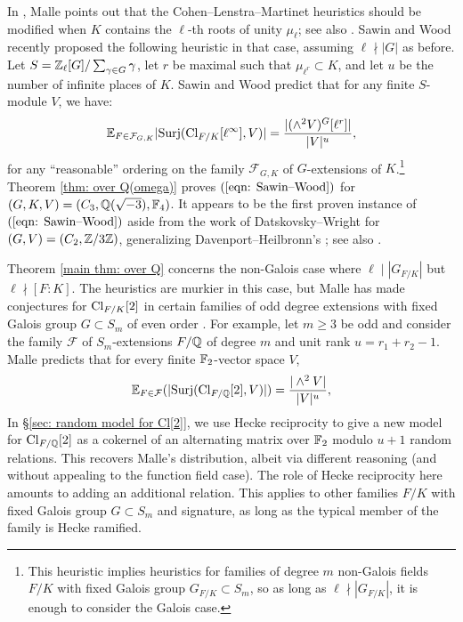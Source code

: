 \documentclass[11pt,a4paper]{amsart}
\def\F{{\rm \mathbb{F}}}
\def\Z{{\rm \mathbb{Z}}}
\def\Q{{\rm \mathbb{Q}}}
\def\Cl{{\rm Cl}}
\numberwithin{equation}{section}
\begin{document}
In  \cite{Malle}, Malle points out that the Cohen--Lenstra--Martinet heuristics should be modified when $K$ contains the $\ell$-th roots of unity $\mu_\ell$; see also \cite{Achter06, Garton2015, LipnowskiSawinTsimerman}. Sawin and Wood \cite{SawinWood} recently proposed the following heuristic in that case, assuming $\ell \nmid |G|$ as before. Let $S = \Z_\ell[G]/\sum_{\gamma \in G} \gamma$, let $r$ be maximal such that $\mu_{\ell^r} \subset K$, and let $u$ be the number of infinite places of $K$.  Sawin and Wood predict that for any finite $S$-module $V$, we have:
\begin{equation} \label{eqn: Sawin--Wood}
    \mathbb{E}_{F \in \mathcal{F}_{G,K}}|\mathrm{Surj}(\Cl_{F/K}[\ell^\infty],V)| = \dfrac{| (\wedge^2 V)^G[\ell^r]|}{|V|^u},
\end{equation}
for any ``reasonable'' ordering on the family $\mathcal{F}_{G,K}$ of $G$-extensions of $K$.\footnote{This heuristic implies heuristics for families of degree $m$ non-Galois fields $F/K$ with fixed Galois group $G_{F/K} \subset S_m$, so as long as $\ell \nmid |G_{F/K}|$, it is enough to consider the Galois case.}  Theorem \ref{thm: over Q(omega)} proves $(\ref{eqn: Sawin--Wood})$ for $(G,K,V) = (C_3,\Q(\sqrt{-3}),\F_4)$. It appears to be the first proven instance of $(\ref{eqn: Sawin--Wood})$ aside from the work of Datskovsky--Wright \cite{DatskovskyWright} for $(G,V) = (C_2,\Z/3\Z)$, generalizing Davenport--Heilbronn's \cite{DavenportHeilbronn}; see also \cite{LemkeOliverWangWood}.      


Theorem \ref{main thm: over Q} concerns the non-Galois case where $\ell \mid |G_{F/K}|$ but $\ell \nmid [F \colon K]$.  The heuristics are murkier in this case, but Malle has made conjectures for $\Cl_{F/K}[2]$ in certain families of odd degree extensions with fixed Galois group $G \subset S_m$ of even order \cite{Malle2010}.  For example, let $m \geq 3$ be odd and consider the family $\mathcal{F}$ of $S_m$-extensions $F/\Q$ of degree $m$ and unit rank $u = r_1 + r_2 - 1$.  Malle predicts that for every finite $\F_2$-vector space $V$, 
\begin{equation} \label{eqn: Malle moments}
    \mathbb{E}_{F \in \mathcal{F}}(|\mathrm{Surj}(\Cl_{F/\Q}[2],V)|) = \dfrac{| \wedge^2 V|}{|V|^u},
\end{equation}
In \S\ref{sec: random model for Cl[2]}, we use Hecke reciprocity to give a new model for $\Cl_{F/\Q}[2]$ as a cokernel of an alternating matrix over $\F_2$ modulo $u + 1$ random relations.  This recovers Malle's distribution, albeit via different reasoning (and without appealing to the function field case).  The role of Hecke reciprocity here amounts to adding an additional relation.  This applies to other families $F/K$ with fixed Galois group $G \subset S_m$ and signature, as long as the typical member of the family is Hecke ramified.
\end{document}
